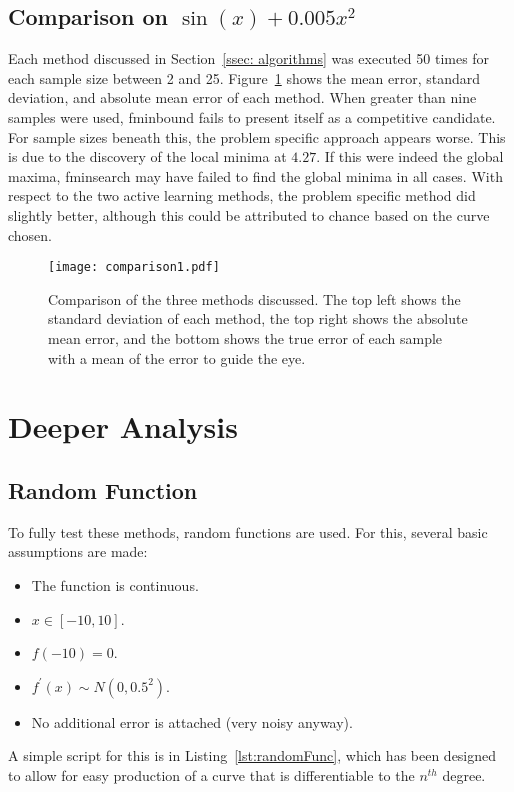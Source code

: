 \subsection[Comparison One]{Comparison on $\sin(x)+0.005x^2$}
\label{ssec:comp1}
Each method discussed in Section~\ref{ssec: algorithms} was executed 50 times for each sample size between 2 and 25. Figure~\ref{fig:firstComparison} shows the mean error, standard deviation, and absolute mean error of each method. When greater than nine samples were used, fminbound \cite{2020SciPy-NMeth} fails to present itself as a competitive candidate. For sample sizes beneath this, the problem specific approach appears worse. This is due to the discovery of the local minima at $4.27$. If this were indeed the global maxima, fminsearch may have failed to find the global minima in all cases. With respect to the two active learning methods, the problem specific method did slightly better, although this could be attributed to chance based on the curve chosen.

\begin{figure}[htbp!] 
  \centering    
  \texttt{[image: comparison1.pdf]}
  \caption[First Comparison]{Comparison of the three methods discussed. The top left shows the standard deviation of each method, the top right shows the absolute mean error, and the bottom shows the true error of each sample with a mean of the error to guide the eye.}
  \label{fig:firstComparison}
\end{figure}

\section{Deeper Analysis}
\subsection{Random Function}
To fully test these methods, random functions are used. For this, several basic assumptions are made:
\begin{itemize}
  \item The function is continuous.
  \item $x\in[-10, 10]$.
  \item $f(-10)=0$.
  \item $f^{\prime}(x)\sim N(0, 0.5^2)$.
  \item No additional error is attached (very noisy anyway).
\end{itemize}
A simple script for this is in Listing~\ref{lst:randomFunc}, which has been designed to allow for easy production of a curve that is differentiable to the $n^{th}$ degree.

